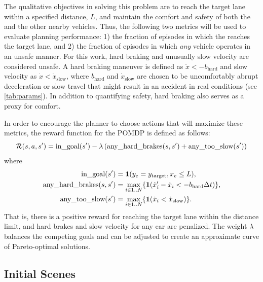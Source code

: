 The qualitative objectives in solving this problem are to reach the target lane within a specified distance, $L$, and maintain the comfort and safety of both the \av{} and the other nearby vehicles.
Thus, the following two metrics will be used to evaluate planning performance: 1) the fraction of episodes in which the \av{} reaches the target lane, and 2) the fraction of episodes in which \emph{any} vehicle operates in an unsafe manner.
For this work, hard braking and unusually slow velocity are considered unsafe.
A hard braking maneuver is defined as $\ddot{x} < -b_\text{hard}$ and slow velocity as $\dot{x} < \dot{x}_\text{slow}$, where $b_\text{hard}$ and $\dot{x}_\text{slow}$ are chosen to be uncomfortably abrupt deceleration or slow travel that might result in an accident in real conditions (see \cref{tab:params}).
In addition to quantifying safety, hard braking also serves as a proxy for comfort.

In order to encourage the planner to choose actions that will maximize these metrics, the reward function for the POMDP is defined as follows: 
\begin{equation} \label{eqn:reward}
    \mathcal{R}(s, a, s') = \text{in\_goal}(s') - \lambda \left(\text{any\_hard\_brakes}(s, s') + \text{any\_too\_slow}(s')\right)
\end{equation}
where
\begin{align}
    \text{in\_goal}(s') &= \mathbf{1}({y}_e = y_\text{target}, {x}_e \leq L) \text{,}\\
    \text{any\_hard\_brakes}(s,s') &= \max_{i \in 1..N}\{\mathbf{1}({\dot{x}}_i' - {\dot{x}}_i < -b_\text{hard} \Delta t) \} \text{,}\\
    \text{any\_too\_slow}(s') &= \max_{i \in 1..N} \{\mathbf{1}({\dot{x}}_i < \dot{x}_\text{slow})\} \text{.}
\end{align}
That is, there is a positive reward for reaching the target lane within the distance limit, and hard brakes and slow velocity for any car are penalized.
The weight $\lambda$ balances the competing goals and can be adjusted to create an approximate curve of Pareto-optimal solutions.

\subsection{Initial Scenes} \label{sec:initial}

